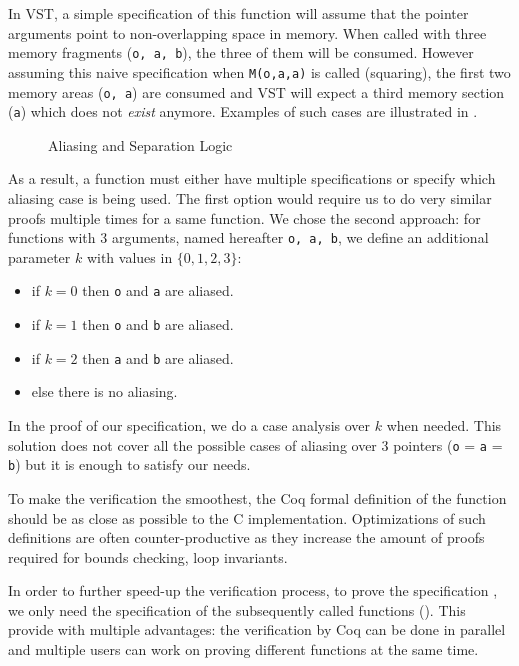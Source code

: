 In VST, a simple specification of this function will assume that the pointer arguments
point to non-overlapping space in memory.
When called with three memory fragments (\texttt{o, a, b}),
the three of them will be consumed. However assuming this naive specification
when \texttt{M(o,a,a)} is called (squaring), the first two memory areas (\texttt{o, a})
are consumed and VST will expect a third memory section (\texttt{a}) which does not \emph{exist} anymore.
Examples of such cases are illustrated in .
\begin{figure}[h]%
  \centering%
  \caption{Aliasing and Separation Logic}%
  \label{tikz:MemSame}%
\end{figure}
As a result, a function must either have multiple specifications or specify which
aliasing case is being used.
The first option would require us to do very similar proofs multiple times for a same function.
We chose the second approach: for functions with 3 arguments, named hereafter \texttt{o, a, b},
we define an additional parameter $k$ with values in $\{0,1,2,3\}$:
\begin{itemize}
  \item if $k=0$ then \texttt{o} and \texttt{a} are aliased.
  \item if $k=1$ then \texttt{o} and \texttt{b} are aliased.
  \item if $k=2$ then \texttt{a} and \texttt{b} are aliased.
  \item else there is no aliasing.
\end{itemize}
In the proof of our specification, we do a case analysis over $k$ when needed.
This solution does not cover all the possible cases of aliasing over 3 pointers
(\eg \texttt{o} = \texttt{a} = \texttt{b}) but it is enough to satisfy our needs.

To make the verification the smoothest, the Coq formal definition of the function
should be as close as possible to the C implementation.
Optimizations of such definitions are often counter-productive as they increase the
amount of proofs required for \eg bounds checking, loop invariants.

In order to further speed-up the verification process, to prove the specification
, we only need the specification of the subsequently
called functions (\eg {}).
This provide with multiple advantages: the verification by Coq can be
done in parallel and multiple users can work on proving different functions at
the same time.
